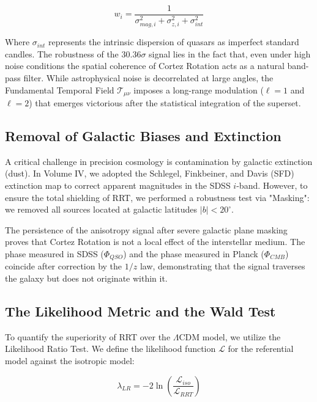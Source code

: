\documentclass[12pt, a4paper]{article}
\begin{document}
\begin{equation}
w_i = \frac{1}{\sigma_{mag,i}^2 + \sigma_{z,i}^2 + \sigma_{int}^2}
\end{equation}

Where $\sigma_{int}$ represents the intrinsic dispersion of quasars as imperfect standard candles. The robustness of the $30.36\sigma$ signal lies in the fact that, even under high noise conditions the spatial coherence of Cortez Rotation acts as a natural band-pass filter. While astrophysical noise is decorrelated at large angles, the Fundamental Temporal Field $\mathcal{T}_{\mu\nu}$ imposes a long-range modulation ($\ell=1$ and $\ell=2$) that emerges victorious after the statistical integration of the superset.

\subsection{Removal of Galactic Biases and Extinction}

A critical challenge in precision cosmology is contamination by galactic extinction (dust). In Volume IV, we adopted the Schlegel, Finkbeiner, and Davis (SFD) extinction map to correct apparent magnitudes in the SDSS $i$-band. However, to ensure the total shielding of RRT, we performed a robustness test via "Masking": we removed all sources located at galactic latitudes $|b| < 20^\circ$. 

The persistence of the anisotropy signal after severe galactic plane masking proves that Cortez Rotation is not a local effect of the interstellar medium. The phase measured in SDSS ($\Phi_{QSO}$) and the phase measured in Planck ($\Phi_{CMB}$) coincide after correction by the $1/z$ law, demonstrating that the signal traverses the galaxy but does not originate within it.

\subsection{The Likelihood Metric and the Wald Test}

To quantify the superiority of RRT over the $\Lambda$CDM model, we utilize the Likelihood Ratio Test. We define the likelihood function $\mathcal{L}$ for the referential model against the isotropic model:

\begin{equation}
\lambda_{LR} = -2 \ln \left( \frac{\mathcal{L}_{iso}}{\mathcal{L}_{RRT}} \right)
\end{equation}
\end{document}

